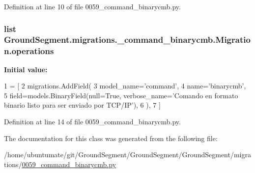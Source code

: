 Definition at line 10 of file 0059\+\_\+command\+\_\+binarycmb.\+py.

\hypertarget{class_ground_segment_1_1migrations_1_10059__command__binarycmb_1_1_migration_ada6a083ce0ab32eb7261ba0ef484890b}{}
\subsubsection[{operations}]{\setlength{\rightskip}{0pt plus 5cm}list Ground\+Segment.\+migrations.\+\_\+command\+\_\+binarycmb.\+Migration.\+operations\hspace{0.3cm}{\ttfamily [static]}}\label{class_ground_segment_1_1migrations_1_10059__command__binarycmb_1_1_migration_ada6a083ce0ab32eb7261ba0ef484890b}
{\bfseries Initial value\+:}
\begin{DoxyCode}
1 = [
2         migrations.AddField(
3             model\_name=\textcolor{stringliteral}{'command'},
4             name=\textcolor{stringliteral}{'binarycmb'},
5             field=models.BinaryField(null=\textcolor{keyword}{True}, verbose\_name=\textcolor{stringliteral}{'Comando en formato binario listo para ser
       enviado por TCP/IP'}),
6         ),
7     ]
\end{DoxyCode}


Definition at line 14 of file 0059\+\_\+command\+\_\+binarycmb.\+py.



The documentation for this class was generated from the following file\+:\begin{DoxyCompactItemize}
\item 
/home/ubuntumate/git/\+Ground\+Segment/\+Ground\+Segment/\+Ground\+Segment/migrations/\hyperlink{0059__command__binarycmb_8py}{0059\+\_\+command\+\_\+binarycmb.\+py}\end{DoxyCompactItemize}
